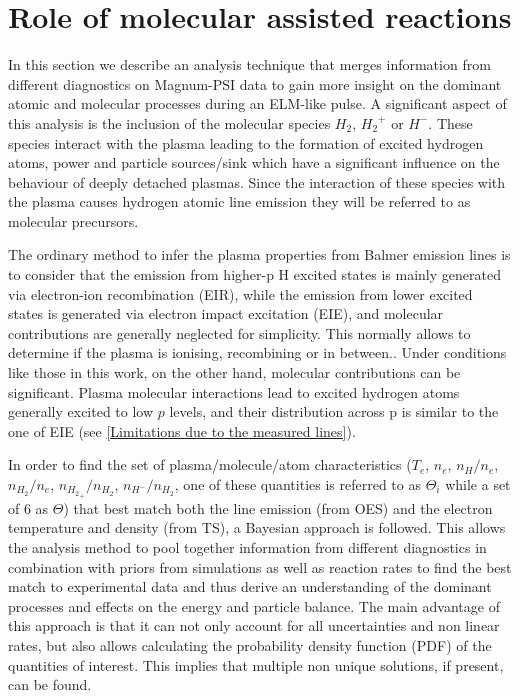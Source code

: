 \section{Role of molecular assisted reactions}\label{Role of molecular assisted reactions}
In this section we describe an analysis technique that merges information from different diagnostics on Magnum-PSI data to gain more insight on the dominant atomic and molecular processes during an ELM-like pulse. A significant aspect of this analysis is the inclusion of the molecular species $H_2$, ${H_2}^+$ or $H^-$. These species interact with the plasma leading to the formation of excited hydrogen atoms, power and particle sources/sink which have a significant influence on the behaviour of deeply detached plasmas. Since the interaction of these species with the plasma causes hydrogen atomic line emission they will be referred to as molecular precursors.

The ordinary method to infer the plasma properties from Balmer emission lines is to consider that the emission from higher-p H excited states is mainly generated via electron-ion recombination (EIR), while the emission from lower excited states is generated via electron impact excitation (EIE), and molecular contributions are generally neglected for simplicity. This normally allows to determine if the plasma is ionising, recombining or in between.\cite{Potzel2012,Verhaegh2019}. Under conditions like those in this work, on the other hand, molecular contributions can be significant.\cite{Akkermans2020} Plasma molecular interactions lead to excited hydrogen atoms generally excited to low $p$ levels, and their distribution across p is similar to the one of EIE (see \autoref{Limitations due to the measured lines}). 

In order to find the set of plasma/molecule/atom characteristics ($T_e$, $n_e$, $n_{H}/n_e$, $n_{H_2}/n_e$, $n_{{H_2}_+}/n_{H_2}$, $n_{{H}^-}/n_{H_2}$, one of these quantities is referred to as $\Theta_i$ while a set of 6 as $\Theta$) that best match both the line emission (from OES) and the electron temperature and density (from TS), a Bayesian approach is followed. This allows the analysis method to pool together information from different diagnostics in combination with priors from simulations as well as reaction rates to find the best match to experimental data and thus derive an understanding of the dominant processes and effects on the energy and particle balance. The main advantage of this approach is that it can not only account for all uncertainties and non linear rates, but also allows calculating the probability density function (PDF) of the quantities of interest. This implies that multiple non unique solutions, if present, can be found.

